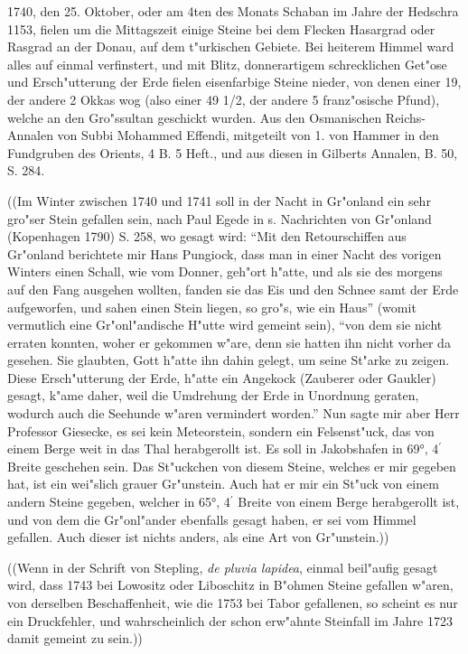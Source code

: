 \documentclass[a4paper, 11pt, oneside, polutonikogreek, german]{article}
\begin{document}
1740, den 25. Oktober, oder am 4ten des Monats Schaban im Jahre der Hedschra 1153, fielen um die Mittagszeit einige Steine bei dem Flecken Hasargrad oder Rasgrad an der Donau, auf dem t"urkischen Gebiete. Bei heiterem Himmel ward alles auf einmal verfinstert, und mit Blitz, donnerartigem schrecklichen Get"ose und Ersch"utterung der Erde fielen eisenfarbige Steine nieder, von denen einer 19, der andere 2 Okkas wog (also einer 49 1/2, der andere 5 franz"osische Pfund), welche an den Gro"ssultan geschickt wurden. Aus den Osmanischen Reichs-Annalen von Subbi Mohammed Effendi, mitgeteilt von 1. von Hammer in den Fundgruben des Orients, 4 B. 5 Heft., und aus diesen in Gilberts Annalen, B. 50, S. 284.

((Im Winter zwischen 1740 und 1741 soll in der Nacht in Gr"onland ein sehr gro"ser Stein gefallen sein, nach Paul Egede in s. Nachrichten von Gr"onland (Kopenhagen 1790) S. 258, wo gesagt wird: "`Mit den Retourschiffen aus Gr"onland berichtete mir Hans Pungiock, dass man in einer Nacht des vorigen Winters einen Schall, wie vom Donner, geh"ort h"atte, und als sie des morgens auf den Fang ausgehen wollten, fanden sie das Eis und den Schnee samt der Erde aufgeworfen, und sahen einen Stein liegen, so gro"s, wie ein Haus"' (womit vermutlich eine Gr"onl"andische H"utte wird gemeint sein), "`von dem sie nicht erraten konnten, woher er gekommen w"are, denn sie hatten ihn nicht vorher da gesehen. Sie glaubten, Gott h"atte ihn dahin gelegt, um seine St"arke zu zeigen. Diese Ersch"utterung der Erde, h"atte ein Angekock (Zauberer oder Gaukler) gesagt, k"ame daher, weil die Umdrehung der Erde in Unordnung geraten, wodurch auch die Seehunde w"aren vermindert worden."' Nun sagte mir aber Herr Professor Giesecke, es sei kein Meteorstein, sondern ein Felsenst"uck, das von einem Berge weit in das Thal herabgerollt ist. Es soll in Jakobshafen in 69°, 4$^{\prime}$ Breite geschehen sein. Das St"uckchen von diesem Steine, welches er mir gegeben hat, ist ein wei"slich grauer Gr"unstein. Auch hat er mir ein St"uck von einem andern Steine gegeben, welcher in 65°, 4$^{\prime}$ Breite von einem Berge herabgerollt ist, und von dem die Gr"onl"ander ebenfalls gesagt haben, er sei vom Himmel gefallen. Auch dieser ist nichts anders, als eine Art von Gr"unstein.))

((Wenn in der Schrift von Stepling, \emph{de pluvia lapidea}, einmal beil"aufig gesagt wird, dass 1743 bei Lowositz oder Liboschitz in B"ohmen Steine gefallen w"aren, von derselben Beschaffenheit, wie die 1753 bei Tabor gefallenen, so scheint es nur ein Druckfehler, und wahrscheinlich der schon erw"ahnte Steinfall im Jahre 1723 damit gemeint zu sein.))
\end{document}
